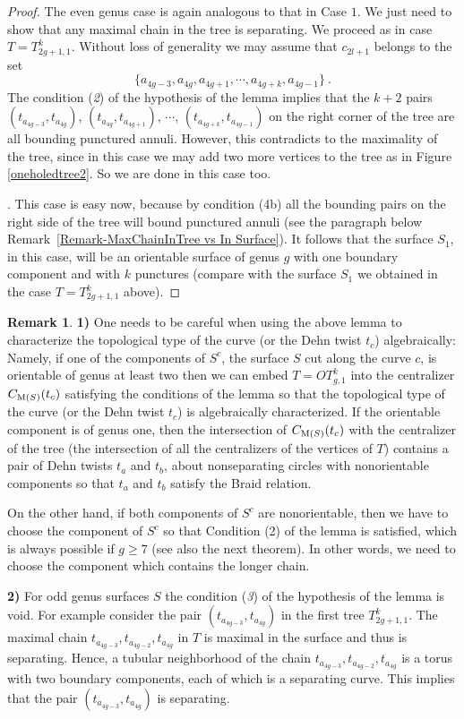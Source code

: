 \documentclass[11 pt]{amsart}
\theoremstyle{definition}
\newtheorem{Remark}[Theorem]{Remark}
\begin{document}
\begin{proof}
The even genus case is again analogous to that in Case $1$. We just
need to show that any maximal chain in the tree is separating. We
proceed as in case $T=T_{2g+1,1}^k$. Without loss of generality we
may assume that $c_{2l+1}$ belongs to the set
$$\{a_{4g-3},a_{4g},a_{4g+1},\cdots,a_{4g+k},a_{4g-1}\} \ .$$
The condition ({\it 2}) of the hypothesis of the lemma implies that
the $k+2$ pairs $(t_{a_{4g-3}},t_{a_{4g}})$,
$(t_{a_{4g}},t_{a_{4g+1}})$, $\cdots$, $(t_{a_{4g+k}},t_{a_{4g-1}})$
on the right corner of the tree are all bounding punctured annuli.
However, this contradicts to the maximality of the tree, since in
this case we may add two more vertices to the tree as in
Figure\,\ref{oneholedtree2}. So we are done in this case too.

\bigskip
{}. This case is easy now,
because by condition (4b) all the bounding pairs on the right side
of the tree will bound punctured annuli (see the paragraph below
Remark~\ref{Remark-MaxChainInTree vs In Surface}). It follows that
the surface $S_1$, in this case, will be an orientable surface of
genus $g$ with one boundary component and with $k$ punctures
(compare with the surface $S_1$ we obtained in the case
$T=T_{2g+1,1}^k$ above).
\end{proof}

\begin{Remark} {\bf 1)} One needs to be careful when using the
above lemma to characterize the topological type of the curve (or
the Dehn twist $t_c$) algebraically: Namely, if one of the
components of $S^c$, the surface $S$ cut along the curve $c$, is
orientable of genus at least two then we can embed $T=OT_{g,1}^k$
into the centralizer $C_{{\rm M}(S)}(t_c)$ satisfying the conditions
of the lemma so that the topological type of the curve (or the Dehn
twist $t_c$) is algebraically characterized. If the orientable
component is of genus one, then the intersection of $C_{{\rm
M}(S)}(t_c)$ with the centralizer of the tree (the intersection of
all the centralizers of the vertices of $T$) contains a pair of Dehn
twists $t_a$ and $t_b$, about nonseparating circles with
nonorientable components so that $t_a$ and $t_b$ satisfy the Braid
relation.

On the other hand, if both components of $S^c$ are nonorientable,
then we have to choose the component of $S^c$ so that Condition (2)
of the lemma is satisfied, which is always possible if $g\geq 7$
(see also the next theorem). In other words, we need to choose the
component which contains the longer chain.

{\bf 2)} For odd genus surfaces $S$ the condition ({\it 3}) of the
hypothesis of the lemma is void. For example consider  the pair
$(t_{a_{4g-3}},t_{a_{4g}})$ in the first tree $T_{2g+1,1}^k$. The
maximal chain  $t_{a_{4g-3}},t_{a_{4g-2}},t_{a_{4g}}$ in $T$ is
maximal in the surface and thus is separating. Hence, a tubular
neighborhood of the chain $t_{a_{4g-3}},t_{a_{4g-2}},t_{a_{4g}}$ is
a torus with two boundary components, each of which is a separating
curve. This implies that the pair $(t_{a_{4g-3}},t_{a_{4g}})$ is
separating.
\end{Remark}
\end{document}
